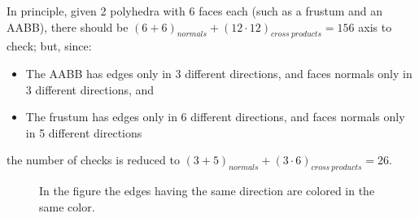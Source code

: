 \documentclass{PoliMi_MasterThesis}
\begin{document}
In principle, given 2 polyhedra with 6 faces each (such as a frustum and an AABB), there should be $(6 + 6)_{normals} + (12\cdot 12)_{cross\: products} = 156$ axis to check; but, since:
\begin{itemize}
	\item The AABB has edges only in 3 different directions, and faces normals only in 3 different directions, and
	\item The frustum has edges only in 6 different directions, and faces normals only in 5 different directions
\end{itemize}
the number of checks is reduced to $(3 + 5)_{normals} + (3\cdot 6)_{cross\: products} = 26$.

\begin{figure}[H]
    \centering
		\qquad
	\caption{In the figure the edges having the same direction are colored in the same color.}
    \label{fig:aabb_frustum_different_edges_directions}
\end{figure}
\end{document}

